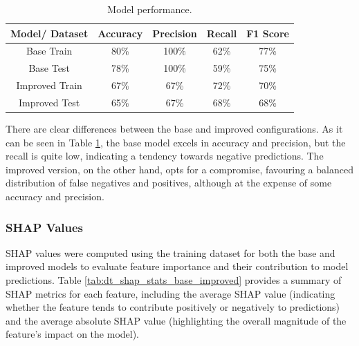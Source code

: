 \documentclass[twoside,11pt]{article}
\begin{document}
\begin{table}[!htb]
\centering
\begin{tabular}{|c|c|c|c|c|}
\hline

\textbf{Model/ Dataset} & \textbf{Accuracy} & \textbf{Precision} & \textbf{Recall} & \textbf{F1 Score} \\ \hline
     Base Train &     80\% &     100\% &   62\% &     77\% \\
      Base Test &     78\% &     100\% &   59\% &     75\% \\
Improved Train &     67\% &      67\% &   72\% &     70\% \\
 Improved Test &     65\% &      67\% &   68\% &     68\% \\

\hline
\end{tabular}
\caption{Model performance.}
\label{tab_perf_tdrogas:}
\end{table}


There are clear differences between the base and improved configurations. As it can be seen in Table \ref{tab_perf_tdrogas:}, the base model excels in accuracy and precision, but the recall is quite low, indicating a tendency towards negative predictions. The improved version, on the other hand, opts for a compromise, favouring a balanced distribution of false negatives and positives, although at the expense of some accuracy and precision.


\subsubsection{SHAP Values}

SHAP values were computed using the training dataset for both the base and improved models to evaluate feature importance and their contribution to model predictions. Table \ref{tab:dt_shap_stats_base_improved} provides a summary of SHAP metrics for each feature, including the average SHAP value (indicating whether the feature tends to contribute positively or negatively to predictions) and the average absolute SHAP value (highlighting the overall magnitude of the feature's impact on the model).
\end{document}
